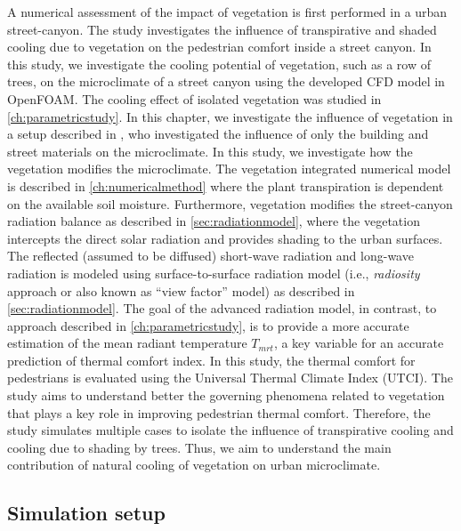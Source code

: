 A numerical assessment of the impact of vegetation is first performed in a urban street-canyon. The study investigates the influence of transpirative and shaded cooling due to vegetation on the pedestrian comfort inside a street canyon. In this study, we investigate the cooling potential of vegetation, such as a row of trees, on the microclimate of a street canyon using the developed CFD model in OpenFOAM. The cooling effect of isolated vegetation was studied in \cref{ch:parametricstudy}. In this chapter, we investigate the influence of vegetation in a setup described in \cite{Kubilay2018}, who investigated the influence of only the building and street materials on the microclimate. In this study,  we investigate how the vegetation modifies the microclimate. The vegetation integrated numerical model is described in \cref{ch:numericalmethod} where the plant transpiration is dependent on the available soil moisture. Furthermore, vegetation modifies the street-canyon radiation balance as described in \cref{sec:radiationmodel}, where the vegetation intercepts the direct solar radiation and provides shading to the urban surfaces. The reflected (assumed to be diffused) short-wave radiation and long-wave radiation is modeled using surface-to-surface radiation model (i.e., \textit{radiosity} approach or also known as ``view factor'' model) as described in \cref{sec:radiationmodel}. The goal of the advanced radiation model, in contrast, to approach described in \cref{ch:parametricstudy}, is to provide a more accurate estimation of the mean radiant temperature $T_{\textit{mrt}}$, a key variable for an accurate prediction of thermal comfort index. In this study, the thermal comfort for pedestrians is evaluated using the Universal Thermal Climate Index (UTCI). The study aims to understand better the governing phenomena related to vegetation that plays a key role in improving pedestrian thermal comfort. Therefore, the study simulates multiple cases to isolate the influence of transpirative cooling and cooling due to shading by trees. Thus, we aim to understand the main contribution of natural cooling of vegetation on urban microclimate.  

\subsection{Simulation setup}

